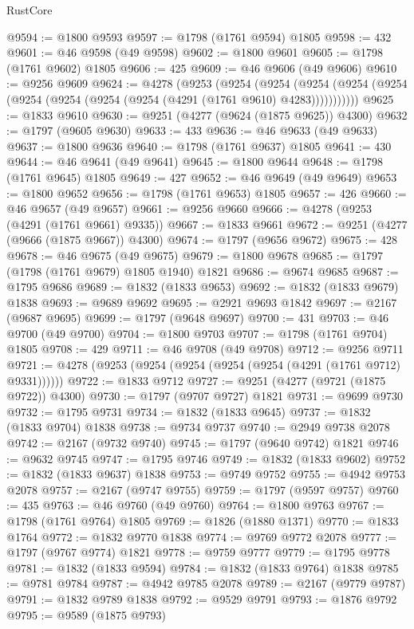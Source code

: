 \begin{lexlean}{RustCore}
\begin{coremodule}
@9594 := @1800 @9593
@9597 := @1798 (@1761 @9594) @1805
@9598 := 432
@9601 := @46 @9598 (@49 @9598)
@9602 := @1800 @9601
@9605 := @1798 (@1761 @9602) @1805
@9606 := 425
@9609 := @46 @9606 (@49 @9606)
@9610 := @9256 @9609
@9624 := @4278
    (@9253
      (@9254
        (@9254
          (@9254 (@9254 (@9254 (@9254 (@9254 (@9254 (@9254 (@4291 (@1761 @9610) @4283)))))))))))
@9625 := @1833 @9610
@9630 := @9251 (@4277 (@9624 (@1875 @9625)) @4300)
@9632 := @1797 (@9605 @9630)
@9633 := 433
@9636 := @46 @9633 (@49 @9633)
@9637 := @1800 @9636
@9640 := @1798 (@1761 @9637) @1805
@9641 := 430
@9644 := @46 @9641 (@49 @9641)
@9645 := @1800 @9644
@9648 := @1798 (@1761 @9645) @1805
@9649 := 427
@9652 := @46 @9649 (@49 @9649)
@9653 := @1800 @9652
@9656 := @1798 (@1761 @9653) @1805
@9657 := 426
@9660 := @46 @9657 (@49 @9657)
@9661 := @9256 @9660
@9666 := @4278 (@9253 (@4291 (@1761 @9661) @9335))
@9667 := @1833 @9661
@9672 := @9251 (@4277 (@9666 (@1875 @9667)) @4300)
@9674 := @1797 (@9656 @9672)
@9675 := 428
@9678 := @46 @9675 (@49 @9675)
@9679 := @1800 @9678
@9685 := @1797 (@1798 (@1761 @9679) @1805 @1940) @1821
@9686 := @9674 @9685
@9687 := @1795 @9686
@9689 := @1832 (@1833 @9653)
@9692 := @1832 (@1833 @9679) @1838
@9693 := @9689 @9692
@9695 := @2921 @9693 @1842
@9697 := @2167 (@9687 @9695)
@9699 := @1797 (@9648 @9697)
@9700 := 431
@9703 := @46 @9700 (@49 @9700)
@9704 := @1800 @9703
@9707 := @1798 (@1761 @9704) @1805
@9708 := 429
@9711 := @46 @9708 (@49 @9708)
@9712 := @9256 @9711
@9721 := @4278 (@9253 (@9254 (@9254 (@9254 (@9254 (@4291 (@1761 @9712) @9331))))))
@9722 := @1833 @9712
@9727 := @9251 (@4277 (@9721 (@1875 @9722)) @4300)
@9730 := @1797 (@9707 @9727) @1821
@9731 := @9699 @9730
@9732 := @1795 @9731
@9734 := @1832 (@1833 @9645)
@9737 := @1832 (@1833 @9704) @1838
@9738 := @9734 @9737
@9740 := @2949 @9738 @2078
@9742 := @2167 (@9732 @9740)
@9745 := @1797 (@9640 @9742) @1821
@9746 := @9632 @9745
@9747 := @1795 @9746
@9749 := @1832 (@1833 @9602)
@9752 := @1832 (@1833 @9637) @1838
@9753 := @9749 @9752
@9755 := @4942 @9753 @2078
@9757 := @2167 (@9747 @9755)
@9759 := @1797 (@9597 @9757)
@9760 := 435
@9763 := @46 @9760 (@49 @9760)
@9764 := @1800 @9763
@9767 := @1798 (@1761 @9764) @1805
@9769 := @1826 (@1880 @1371)
@9770 := @1833 @1764
@9772 := @1832 @9770 @1838
@9774 := @9769 @9772 @2078
@9777 := @1797 (@9767 @9774) @1821
@9778 := @9759 @9777
@9779 := @1795 @9778
@9781 := @1832 (@1833 @9594)
@9784 := @1832 (@1833 @9764) @1838
@9785 := @9781 @9784
@9787 := @4942 @9785 @2078
@9789 := @2167 (@9779 @9787)
@9791 := @1832 @9789 @1838
@9792 := @9529 @9791
@9793 := @1876 @9792
@9795 := @9589 (@1875 @9793)

\end{coremodule}
\end{lexlean}

